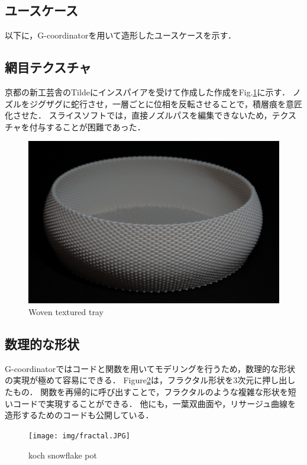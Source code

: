\documentclass{article}
\begin{document}
\begin{twocolumn}
\begin{itemize}
\section{ユースケース}
以下に，G-coordinatorを用いて造形したユースケースを示す．

\subsection{網目テクスチャ}

京都の新工芸舎\cite{shinkogeisha}のTilde\cite{tildeprinted}にインスパイアを受けて作成した作成をFig.\ref{fig:WaveTray}に示す．
ノズルをジグザグに蛇行させ，一層ごとに位相を反転させることで，積層痕を意匠化させた．
スライスソフトでは，直接ノズルパスを編集できないため，テクスチャを付与することが困難であった．

\begin{figure}[htbp]
  \includegraphics[width=\linewidth]{img/wave_tray.JPG}
  \caption{Woven textured tray}
  \label{fig:WaveTray}
\end{figure}

\subsection{数理的な形状}\label{sec:mathmaticalShape}
G-coordinatorではコードと関数を用いてモデリングを行うため，数理的な形状の実現が極めて容易にできる．
Figure\ref{fig:fractal}は，フラクタル形状を3次元に押し出したもの．
関数を再帰的に呼び出すことで，フラクタルのような複雑な形状を短いコードで実現することができる．
他にも，一葉双曲面や，リサージュ曲線を造形するためのコードも公開している．

\begin{figure}[htbp]
  \texttt{[image: img/fractal.JPG]}
  \caption{koch snowflake pot}
  \label{fig:fractal}
\end{figure}


\end{itemize}
\end{twocolumn}
\end{document}
